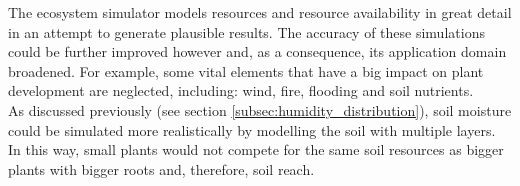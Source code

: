 The ecosystem simulator models resources and resource availability in great detail in an attempt to generate plausible results. The accuracy of these simulations could be further improved however and, as a consequence, its application domain broadened. For example, some vital elements that have a big impact on plant development are neglected, including: wind, fire, flooding and soil nutrients.\\
As discussed previously (see section \ref{subsec:humidity_distribution}), soil moisture could be simulated more realistically by modelling the soil with multiple layers. In this way, small plants would not compete for the same soil resources as bigger plants with bigger roots and, therefore, soil reach.\\ 

